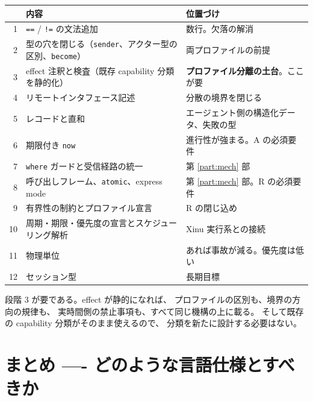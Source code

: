 \documentclass[11pt,a4paper]{ltjsarticle}
\theoremstyle{remark}
\begin{document}
\begin{center}
\small
\begin{tabular}{@{}rlp{6.6cm}@{}}
\toprule
 & 内容 & 位置づけ \\
\midrule
1 & \texttt{==} / \texttt{!=} の文法追加 & 数行。欠落の解消 \\
2 & 型の穴を閉じる（\texttt{sender}、アクター型の区別、\texttt{become}）&
  両プロファイルの前提 \\
3 & effect 注釈と検査（既存 capability 分類を静的化）&
  \textbf{プロファイル分離の土台}。ここが要 \\
4 & リモートインタフェース記述 & 分散の境界を閉じる \\
5 & レコードと直和 & エージェント側の構造化データ、失敗の型 \\
6 & 期限付き \texttt{now} & 進行性が強まる。A の必須要件 \\
7 & \texttt{where} ガードと受信経路の統一 & 第 \ref{part:mech} 部 \\
8 & 呼び出しフレーム、\texttt{atomic}、express mode &
  第 \ref{part:mech} 部。R の必須要件 \\
9 & 有界性の制約とプロファイル宣言 & R の閉じ込め \\
10 & 周期・期限・優先度の宣言とスケジューリング解析 &
  Xinu 実行系との接続 \\
11 & 物理単位 & あれば事故が減る。優先度は低い \\
12 & セッション型 & 長期目標 \\
\bottomrule
\end{tabular}
\end{center}

段階 3 が要である。effect が静的になれば、
プロファイルの区別も、境界の方向の規律も、
実時間側の禁止事項も、すべて同じ機構の上に載る。
そして既存の capability 分類がそのまま使えるので、
分類を新たに設計する必要はない。

\section{まとめ ---- どのような言語仕様とすべきか}
\end{document}
